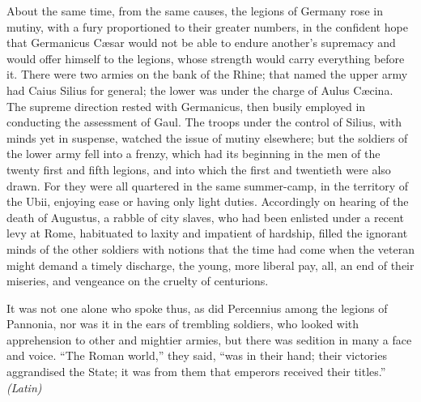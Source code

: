 
About the same time, from the same causes, the legions of Germany rose in mutiny, with a fury proportioned to their greater numbers, in the confident hope that Germanicus Cæsar would not be able to endure another's supremacy and would offer himself to the legions, whose strength would carry everything before it. There were two armies on the bank of the Rhine; that named the upper army had Caius Silius for general; the lower was under the charge of Aulus Cæcina. The supreme direction rested with Germanicus, then busily employed in conducting the assessment of Gaul. The troops under the control of Silius, with minds yet in suspense, watched the issue of mutiny elsewhere; but the soldiers of the lower army fell into a frenzy, which had its beginning in the men of the twenty first and fifth legions, and into which the first and twentieth were also drawn. For they were all quartered in the same summer-camp, in the territory of the Ubii, enjoying ease or having only light duties. Accordingly on hearing of the death of Augustus, a rabble of city slaves, who had been enlisted under a recent levy at Rome, habituated to laxity and impatient of hardship, filled the ignorant minds of the other soldiers with notions that the time had come when the veteran might demand a timely discharge, the young, more liberal pay, all, an end of their miseries, and vengeance on the cruelty of centurions.

It was not one alone who spoke thus, as did Percennius among the legions of Pannonia, nor was it in the ears of trembling soldiers, who looked with apprehension to other and mightier armies, but there was sedition in many a face and voice. ``The Roman world,'' they said, ``was in their hand; their victories aggrandised the State; it was from them that emperors received their titles.'' \emph{(Latin)}


